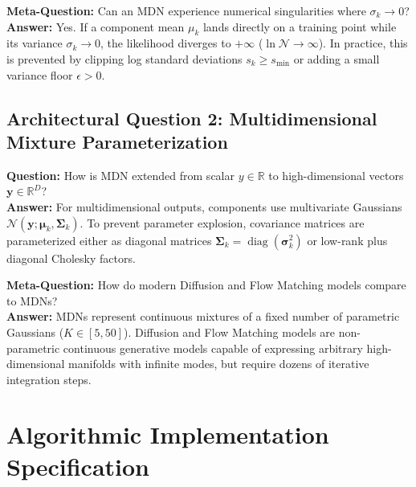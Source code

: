 \documentclass[11pt,a4paper]{article}
\theoremstyle{definition}
\begin{document}
\textbf{Meta-Question:} Can an MDN experience numerical singularities where $\sigma_k \to 0$?\\
\textbf{Answer:} Yes. If a component mean $\mu_k$ lands directly on a training point while its variance $\sigma_k \to 0$, the likelihood diverges to $+\infty$ ($\ln \mathcal{N} \to \infty$). In practice, this is prevented by clipping log standard deviations $s_k \ge s_{\min}$ or adding a small variance floor $\epsilon > 0$.

\subsection{Architectural Question 2: Multidimensional Mixture Parameterization}
\textbf{Question:} How is MDN extended from scalar $y \in \mathbb{R}$ to high-dimensional vectors $\mathbf{y} \in \mathbb{R}^D$?\\
\textbf{Answer:} For multidimensional outputs, components use multivariate Gaussians $\mathcal{N}(\mathbf{y}; \boldsymbol{\mu}_k, \boldsymbol{\Sigma}_k)$. To prevent parameter explosion, covariance matrices are parameterized either as diagonal matrices $\boldsymbol{\Sigma}_k = \operatorname{diag}(\boldsymbol{\sigma}_k^2)$ or low-rank plus diagonal Cholesky factors.

\textbf{Meta-Question:} How do modern Diffusion and Flow Matching models compare to MDNs?\\
\textbf{Answer:} MDNs represent continuous mixtures of a fixed number of parametric Gaussians ($K \in [5, 50]$). Diffusion and Flow Matching models are non-parametric continuous generative models capable of expressing arbitrary high-dimensional manifolds with infinite modes, but require dozens of iterative integration steps.

\section{Algorithmic Implementation Specification}
\end{document}
